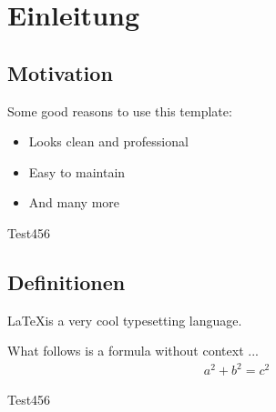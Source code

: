 \section{Einleitung}

  \subsection*{Motivation}

    \begin{frame}
      Some good reasons to use this template:

      \begin{itemize}
        \item Looks clean and professional
        \item Easy to maintain
        \item And many more
      \end{itemize}
    \end{frame}

    \begin{frame}
      Test456
    \end{frame}

  \subsection*{Definitionen}

    \begin{frame}
      \begin{definition}[\LaTeX]
          \LaTeX is a very cool typesetting language.
      \end{definition}

      \pause What follows is a formula without context ...
      \pause \begin{align}
        a^2 + b^2 = c^2
      \end{align}
    \end{frame}

    \begin{frame}
      Test456
    \end{frame}

